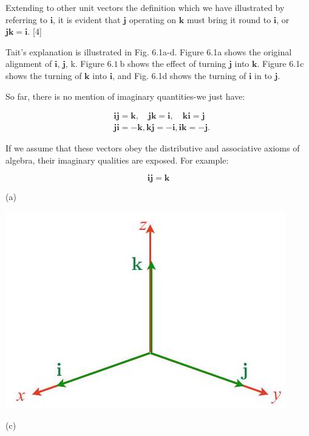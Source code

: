 \documentclass[10pt]{article}
\begin{document}
Extending to other unit vectors the definition which we have illustrated by referring to $\mathbf{i}$, it is evident that $\mathbf{j}$ operating on $\mathbf{k}$ must bring it round to $\mathbf{i}$, or $\mathbf{j} \mathbf{k}=\mathbf{i}$. [4]

Tait's explanation is illustrated in Fig. 6.1a-d. Figure 6.1a shows the original alignment of $\mathbf{i}$, $\mathbf{j}$, k. Figure $6.1 \mathrm{~b}$ shows the effect of turning $\mathbf{j}$ into $\mathbf{k}$. Figure 6.1c shows the turning of $\mathbf{k}$ into $\mathbf{i}$, and Fig. 6.1d shows the turning of $\mathbf{i}$ in to $\mathbf{j}$.

So far, there is no mention of imaginary quantities-we just have:

$$
\begin{aligned}
& \mathbf{i j}=\mathbf{k}, \quad \mathbf{j k}=\mathbf{i}, \quad \mathbf{k i}=\mathbf{j} \\
& \mathbf{j i}=-\mathbf{k}, \mathbf{k j}=-\mathbf{i}, \mathbf{i k}=-\mathbf{j} .
\end{aligned}
$$

If we assume that these vectors obey the distributive and associative axioms of algebra, their imaginary qualities are exposed. For example:

$$
\mathbf{i j}=\mathbf{k}
$$

(a)

\begin{center}
\includegraphics[max width=\textwidth]{2023_04_20_41f1ceac5a31dc7d1b59g-089(1)}
\end{center}

(c)
\end{document}
